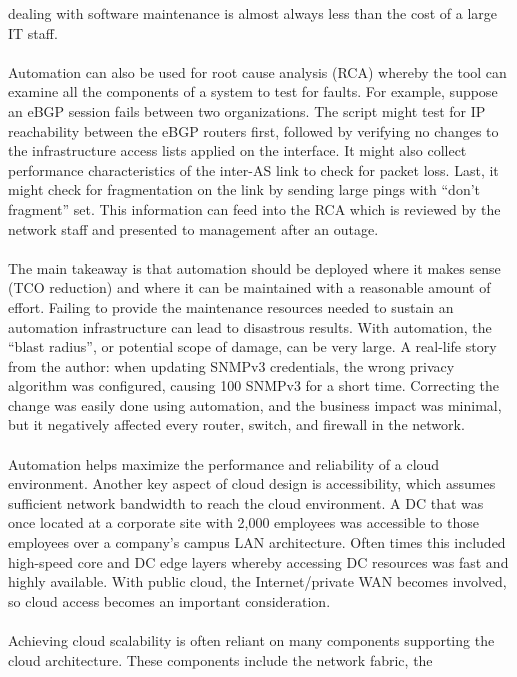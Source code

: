dealing with software maintenance is almost always less than the cost of a
large IT staff.
\\ \\
Automation can also be used for root cause analysis (RCA) whereby the tool can
examine all the components of a system to test for faults. For example,
suppose an eBGP session fails between two organizations. The script might test
for IP reachability between the eBGP routers first, followed by verifying no
changes to the infrastructure access lists applied on the interface. It might
also collect performance characteristics of the inter-AS link to check for
packet loss. Last, it might check for fragmentation on the link by sending
large pings with ``don’t fragment'' set. This information can feed into the RCA
which is reviewed by the network staff and presented to management after an
outage.
\\ \\
The main takeaway is that automation should be deployed where it makes sense
(TCO reduction) and where it can be maintained with a reasonable amount of
effort. Failing to provide the maintenance resources needed to sustain an
automation infrastructure can lead to disastrous results. With automation, the
``blast radius'', or potential scope of damage, can be very large. A real-life
story from the author: when updating SNMPv3 credentials, the wrong privacy
algorithm was configured, causing 100%
SNMPv3 for a short time. Correcting the change was easily done using
automation, and the business impact was minimal, but it negatively affected
every router, switch, and firewall in the
network.
\\ \\
Automation helps maximize the performance and reliability of a cloud
environment. Another key aspect of cloud design is accessibility, which
assumes sufficient network bandwidth to reach the cloud environment. A DC that
was once located at a corporate site with 2,000 employees was accessible to
those employees over a company’s campus LAN architecture. Often times this
included high-speed core and DC edge layers whereby accessing DC resources was
fast and highly available. With public cloud, the Internet/private WAN becomes
involved, so cloud access becomes an important consideration.
\\ \\
Achieving cloud scalability is often reliant on many components supporting the
cloud architecture. These components include the network fabric, the
